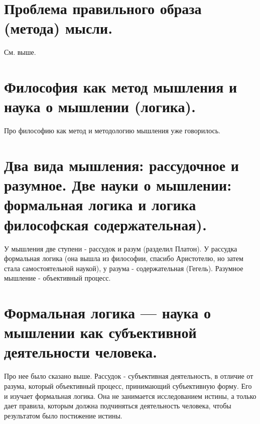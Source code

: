 \section{ Проблема правильного образа (метода) мысли.}
См. выше.

\section{ Философия как метод мышления и наука о мышлении (логика).}
Про философию как метод и методологию мышления уже говорилось. 

\section{ Два вида мышления: рассудочное и разумное. Две науки о мышлении: формальная логика и логика философская содержательная).}
У мышления две ступени - рассудок и разум (разделил Платон). У рассудка формальная логика (она вышла из философии, спасибо Аристотелю, но затем стала самостоятельной наукой), у разума - содержательная (Гегель). Разумное мышление - объективный процесс.

\section{ Формальная логика — наука о мышлении как субъективной деятельности человека.}
Про нее было сказано выше. Рассудок - субъективная деятельность, в отличие от разума, который объективный процесс, принимающий субъективную форму. Его и изучает формальная логика. Она не занимается исследованием истины, а только дает правила, которым должна подчиняться деятельность человека, чтобы результатом было постижение истины.

